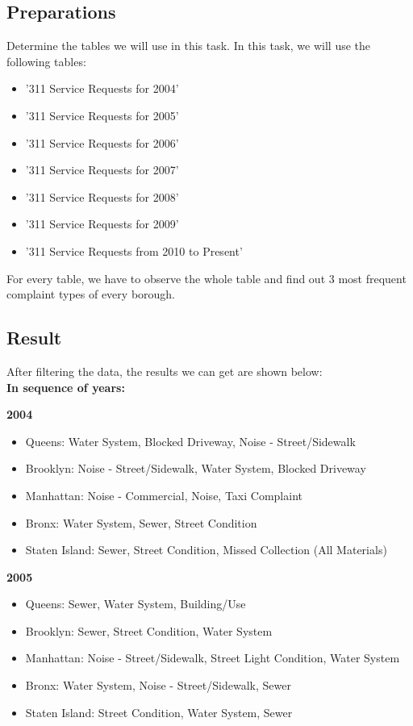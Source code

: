 \documentclass[sigconf]{acmart}
\begin{document}
\subsection{Preparations}
Determine the tables we will use in this task. In this task, we will use the following tables:
\begin{itemize}
    \item '311 Service Requests for 2004'
    \item '311 Service Requests for 2005'
    \item '311 Service Requests for 2006'
    \item '311 Service Requests for 2007'
    \item '311 Service Requests for 2008'
    \item '311 Service Requests for 2009'
    \item '311 Service Requests from 2010 to Present'
\end{itemize}
For every table, we have to observe the whole table and find out 3 most frequent complaint types of every borough.

\subsection{Result}
After filtering the data, the results we can get are shown below:\\
\textbf{In sequence of years:}

\textbf{2004}
\begin{itemize}
    \item Queens: Water System, Blocked Driveway, Noise - Street/Sidewalk
    \item Brooklyn: Noise - Street/Sidewalk, Water System, Blocked Driveway
    \item Manhattan: Noise - Commercial, Noise, Taxi Complaint
    \item Bronx: Water System, Sewer, Street Condition
    \item Staten Island: Sewer, Street Condition, Missed Collection (All Materials)
\end{itemize}


\textbf{2005}
\begin{itemize}
    \item Queens: Sewer, Water System, Building/Use
    \item Brooklyn: Sewer, Street Condition, Water System
    \item Manhattan: Noise - Street/Sidewalk, Street Light Condition, Water System
    \item Bronx: Water System, Noise - Street/Sidewalk, Sewer
    \item Staten Island: Street Condition, Water System, Sewer
\end{itemize}
\end{document}
